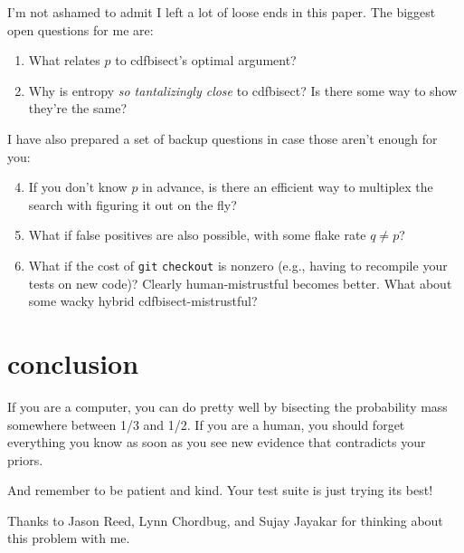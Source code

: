 \documentclass[11pt]{sigplanconf}
\begin{document}
I'm not ashamed to admit I left a lot of loose ends in this paper.
The biggest open questions for me are:
\begin{enumerate}
	\item What relates $p$ to {\sf cdfbisect}'s optimal argument?
	\item Why is {\sf entropy} {\it so tantalizingly close} to {\sf cdfbisect}? Is there some way to show they're the same?
\end{enumerate}
I have also prepared a set of backup questions in case those aren't enough for you:
\begin{enumerate}
	\setcounter{enumi}{3} %
	\item If you don't know $p$ in advance, is there an efficient way to multiplex the search with figuring it out on the fly?
	\item What if false positives are also possible, with some flake rate $q \ne p$?
	\item What if the cost of {\tt git} {\tt checkout} is nonzero (e.g., having to recompile your tests on new code)?
		Clearly {\sf human-mistrustful} becomes better.
		What about some wacky hybrid {\sf cdfbisect-mistrustful}?
\end{enumerate}


\setcounter{section}{6} %
\section{conclusion}

If you are a computer, you can do pretty well by bisecting the probability mass somewhere between 1/3 and 1/2.
%
If you are a human, you should forget everything you know as soon as you see new evidence that contradicts your priors.

And remember to be patient and kind. Your test suite is just trying its best!

\acks

Thanks to Jason Reed, Lynn Chordbug, and Sujay Jayakar for thinking about this problem with me.


\renewcommand{\refname}{referents}


\end{document}
